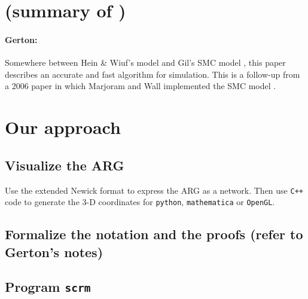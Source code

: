 \section{(summary of \citet{Chen2009})}
{\color{red}\paragraph{Gerton:}Somewhere between Hein \& Wiuf's model \citep{Wiuf1999} and Gil's SMC model \citep{McVean2005}, this paper describes an accurate and fast algorithm for simulation.  This is a follow-up from a 2006 paper in which Marjoram and Wall implemented the SMC model \citep{Marjoram2006}.}



\section{Our approach}
\subsection{Visualize the ARG}
Use the extended Newick format to express the ARG as a network. Then use {\tt C++} code to generate the 3-D coordinates for {\tt python}, {\tt mathematica} or {\tt OpenGL}.


%



\subsection{Formalize the notation and the proofs (refer to Gerton's notes)}


\subsection{Program {\tt scrm}}


